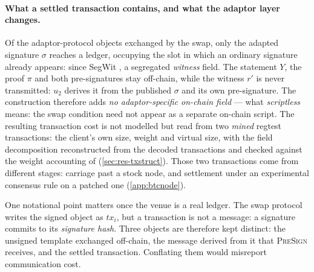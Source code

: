 \paragraph{What a settled transaction contains, and what the adaptor layer changes.}
Of the adaptor-protocol objects exchanged by
the swap, only the adapted signature $\sigma$ reaches a ledger, occupying the slot in
which an ordinary signature already appears: since SegWit
\cite{bip141}, a segregated \emph{witness} field. The statement $Y$, the proof $\pi$ and
both pre-signatures stay off-chain, while the witness $r'$ is never transmitted: $u_2$
derives it from the published $\sigma$ and its own pre-signature. The construction
therefore adds \emph{no adaptor-specific on-chain field} --- what \emph{scriptless}
means: the swap condition need not appear as a separate on-chain script. The resulting
transaction cost is not modelled but read from two \emph{mined} regtest transactions: the
client's own size, weight and virtual size, with the field decomposition reconstructed
from the decoded transactions and checked against the weight accounting of
\cite{bip141,bip144,bip341} (\cref{sec:res-txstruct}).
Those two transactions come from different stages: carriage past a stock node, and
settlement under an experimental consensus rule on a patched one (\cref{app:btcnode}).

One notational point matters once the venue is a real ledger. The swap protocol writes the
signed object as $\mathit{tx}_i$, but a transaction is not a message: a signature commits to
its \emph{signature hash}. Three objects are therefore kept distinct: the unsigned
template exchanged off-chain, the message derived from it that \textsc{PreSign} receives,
and the settled transaction. Conflating them would misreport communication cost.

